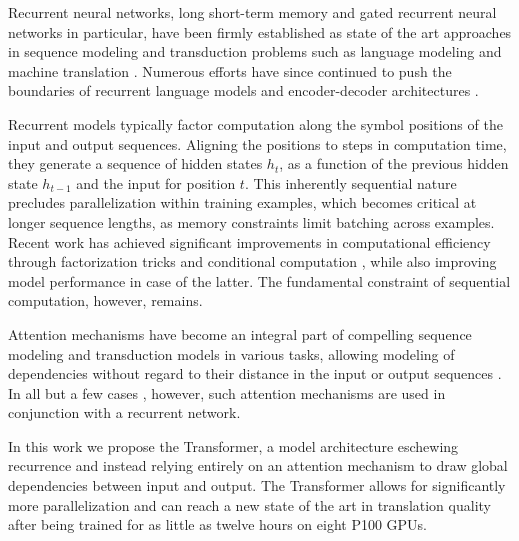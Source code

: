 Recurrent neural networks, long short-term memory \citep{hochreiter1997} and gated recurrent \citep{gruEval14} neural networks in particular, have been firmly established as state of the art approaches in sequence modeling and transduction problems such as language modeling and machine translation \citep{sutskever14, bahdanau2014neural, cho2014learning}. Numerous efforts have since continued to push the boundaries of recurrent language models and encoder-decoder architectures \citep{wu2016google,luong2015effective,jozefowicz2016exploring}.

Recurrent models typically factor computation along the symbol positions of the input and output sequences. Aligning the positions to steps in computation time, they generate a sequence of hidden states $h_t$, as a function of the previous hidden state $h_{t-1}$ and the input for position $t$. This inherently sequential nature precludes parallelization within training examples, which becomes critical at longer sequence lengths, as memory constraints limit batching across examples.
Recent work has achieved significant improvements in computational efficiency through factorization tricks \citep{Kuchaiev2017Factorization} and conditional computation \citep{shazeer2017outrageously}, while also improving model performance in case of the latter. The fundamental constraint of sequential computation, however, remains.


Attention mechanisms have become an integral part of compelling sequence modeling and transduction models in various tasks, allowing modeling of dependencies without regard to their distance in the input or output sequences \citep{bahdanau2014neural, structuredAttentionNetworks}. In all but a few cases \citep{decomposableAttnModel}, however, such attention mechanisms are used in conjunction with a recurrent network.


In this work we propose the Transformer, a model architecture eschewing recurrence and instead relying entirely on an attention mechanism to draw global dependencies between input and output. The Transformer allows for significantly more parallelization and can reach a new state of the art in translation quality after being trained for as little as twelve hours on eight P100 GPUs.


